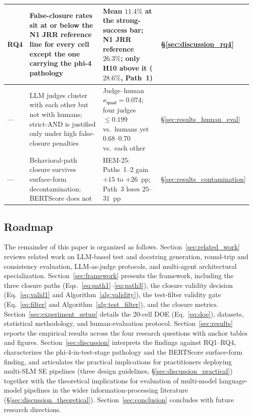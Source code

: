 \begin{table}[!htbp]
\begin{tabular}{@{}p{0.55cm}p{4.9cm}p{4.9cm}p{1.1cm}@{}}
\addlinespace
RQ4 & False-closure rates sit at or below the N1 JRR reference line for every cell except the one carrying the phi-4 pathology & Mean $11.4\%$ at the strong-success bar; N1 JRR reference $26.3\%$; only H10 above it ($28.6\%$, Path~1) & \S\ref{sec:discussion_rq4} \\
\midrule
--- & LLM judges cluster with each other but not with humans; strict-AND is justified only under high false-closure penalties & Judge--human $\kappa_{\textsf{quad}} = 0.074$; four judges $\leq 0.199$ vs.\ humans yet $0.68$--$0.70$ vs.\ each other & \S\ref{sec:results_human_eval} \\
\addlinespace
--- & Behavioral-path closure survives surface-form decontamination; BERTScore does not & HEM-25: Paths~1--2 gain $+15$ to $+26$~pp; Path~3 loses $25$--$31$~pp & \S\ref{sec:results_contamination} \\
\bottomrule
\end{tabular}
\end{table}

\subsection{Roadmap}

The remainder of this paper is organized as follows. Section~\ref{sec:related_work} reviews related work on LLM-based test and docstring generation, round-trip and consistency evaluation, LLM-as-judge protocols, and multi-agent architectural specialization. Section~\ref{sec:framework} presents the framework, including the three closure paths (Eqs.~\ref{eq:path1}--\ref{eq:path3}), the closure validity decision (Eq.~\ref{eq:valid1} and Algorithm~\ref{alg:validity}), the test-filter validity gate (Eq.~\ref{eq:filter} and Algorithm~\ref{alg:test_filter}), and the closure metrics. Section~\ref{sec:experiment_setup} details the 20-cell DOE (Eq.~\ref{eq:doe}), datasets, statistical methodology, and human-evaluation protocol. Section~\ref{sec:results} reports the empirical results across the four research questions with anchor tables and figures. Section~\ref{sec:discussion} interprets the findings against RQ1--RQ4, characterizes the phi-4-in-test-stage pathology and the BERTScore surface-form finding, and articulates the practical implications for practitioners deploying multi-SLM SE pipelines (three design guidelines, \S\ref{sec:discussion_practical}) together with the theoretical implications for evaluation of multi-model language-model pipelines in the wider information-processing literature (\S\ref{sec:discussion_theoretical}). Section~\ref{sec:conclusion} concludes with future research directions.
